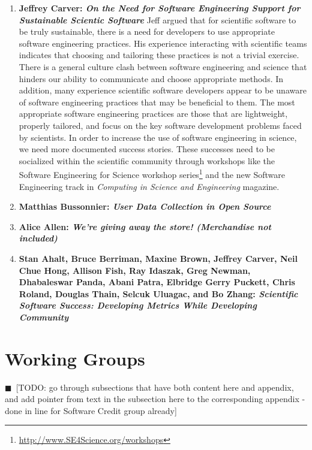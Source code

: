 \documentclass[11pt, oneside]{amsart}
\newcommand{\todo}[1]{{\color{blue}$\blacksquare$~\textsf{[TODO: #1]}}}
\begin{document}
\begin{enumerate}
\item \textbf{Jeffrey Carver: \textit{On the Need for Software Engineering Support for
Sustainable Scientic Software}}
Jeff argued that for scientific software to be truly sustainable, there is a need
for developers to use appropriate software engineering practices. His experience
interacting with scientific teams indicates that choosing and tailoring these
practices is not a trivial exercise. There is a general culture clash between
software engineering and science that hinders our ability to communicate and
choose appropriate methods. In addition, many experience scientific software
developers appear to be unaware of software engineering practices that may be
beneficial to them. The most appropriate software engineering practices are
those that are lightweight, properly tailored, and focus on the key software
development problems faced by scientists. In order to increase the use of
software engineering in science, we need more documented success stories. These
successes need to be socialized within the scientific community through
workshops like the Software Engineering for Science workshop
series\footnote{\href{http://www.SE4Science.org/workshops}{http://www.SE4Science.org/workshops}}
and the new Software Engineering track in
\textit{Computing in Science and Engineering} magazine.

\item \textbf{Matthias Bussonnier: \textit{User Data Collection in Open Source}}

\item \textbf{Alice Allen: \textit{We’re giving away the store! (Merchandise not
included)}}

\item \textbf{Stan Ahalt, Bruce Berriman, Maxine Brown, Jeffrey Carver, Neil
Chue Hong, Allison Fish, Ray Idaszak, Greg Newman, Dhabaleswar Panda, Abani
Patra, Elbridge Gerry Puckett, Chris Roland, Douglas Thain, Selcuk Uluagac, and
Bo Zhang: \textit{Scientific Software Success: Developing Metrics While Developing
Community}}

\end{enumerate}

\section{Working Groups} \label{sec:WGs}

\todo{go through subsections that have both content here and appendix, and add pointer from text in the subsection here to the corresponding appendix - done in line for Software Credit group already}
\end{document}
